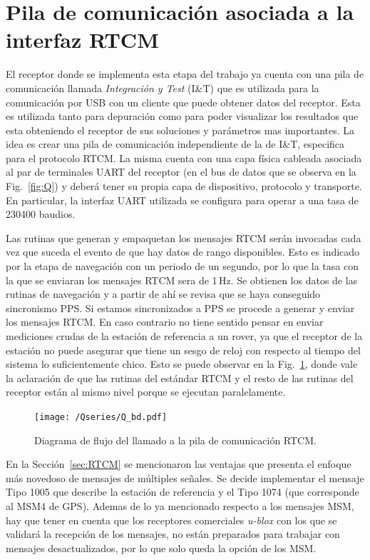 \documentclass[a4paper,12pt,oneside,onecolumn,final,openright]{book}%
\begin{document}
\section{Pila de comunicación asociada a la interfaz RTCM}
	El receptor donde se implementa esta etapa del trabajo ya cuenta con una pila de comunicación llamada \textit{Integración y Test} (I\&T) que es utilizada para la comunicación por USB con un cliente que puede obtener datos del receptor. Esta es utilizada tanto para depuración como para poder visualizar los resultados que esta obteniendo el receptor de sus soluciones y parámetros mas importantes. La idea es crear una pila de comunicación independiente de la de I\&T, especifica para el protocolo RTCM. La misma cuenta con una capa física cableada asociada al par de terminales UART del receptor (en el bus de datos que se observa en la Fig.~\ref{fig:Q}) y deberá tener su propia capa de dispositivo, protocolo y transporte. En particular, la interfaz UART utilizada se configura para operar a una tasa de 230400 baudios. 
	
	Las rutinas que generan y empaquetan los mensajes RTCM serán invocadas cada vez que suceda el evento de que hay datos de rango disponibles. Esto es indicado por la etapa de navegación con un periodo de un segundo, por lo que la tasa con la que se enviaran los mensajes RTCM sera de 1\,Hz. Se obtienen los datos de las rutinas de navegación y a partir de ahí se revisa que se haya conseguido sincronismo PPS. Si estamos sincronizados a PPS se procede a generar y enviar los mensajes RTCM. En caso contrario no tiene sentido pensar en enviar mediciones crudas de la estación de referencia a un rover, ya que el receptor de la estación no puede asegurar que tiene un sesgo de reloj con respecto al tiempo del sistema lo suficientemente chico. Esto se puede observar en la Fig.~\ref{fig:diagramaflujo_RTCM}, donde vale la aclaración de que las rutinas del estándar RTCM y el resto de las rutinas del receptor están al mismo nivel porque se ejecutan paralelamente.

\begin{figure}
    \centering
	\texttt{[image: /Qseries/Q\_bd.pdf]}
    \caption{Diagrama de flujo del llamado a la pila de comunicación RTCM.}
    \label{fig:diagramaflujo_RTCM}
\end{figure}

	En la Sección~\ref{sec:RTCM} se mencionaron las ventajas que presenta el enfoque más novedoso de mensajes de múltiples señales. Se decide implementar el mensaje Tipo 1005 que describe la estación de referencia y el Tipo 1074 (que corresponde al MSM4 de GPS). Ademas de lo ya mencionado respecto a los mensajes MSM, hay que tener en cuenta que los receptores comerciales \textit{u-blox} con los que se validará la recepción de los mensajes, no están preparados para trabajar con mensajes desactualizados, por lo que solo queda la opción de los MSM.
	
\end{document}
